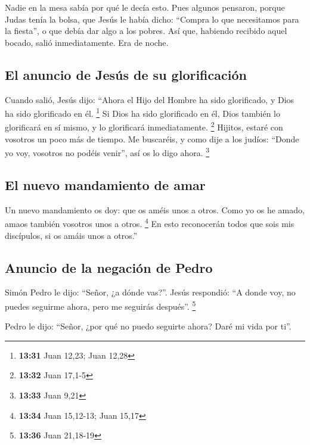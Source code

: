 \begin{paracol}{2}
 Nadie en la mesa sabía por qué le decía esto.
 Pues algunos pensaron, porque Judas tenía la bolsa, que
Jesús le había dicho: ``Compra lo que necesitamos para la fiesta'', o
que debía dar algo a los pobres.  Así que, habiendo
recibido aquel bocado, salió inmediatamente. Era de noche.

\hypertarget{el-anuncio-de-jesuxfas-de-su-glorificaciuxf3n}{%
\subsection{El anuncio de Jesús de su
glorificación}\label{el-anuncio-de-jesuxfas-de-su-glorificaciuxf3n}}

 Cuando salió, Jesús dijo: ``Ahora el Hijo del Hombre ha
sido glorificado, y Dios ha sido glorificado en él. \footnote{\textbf{13:31}
  Juan 12,23; Juan 12,28}  Si Dios ha sido glorificado en
él, Dios también lo glorificará en sí mismo, y lo glorificará
inmediatamente. \footnote{\textbf{13:32} Juan 17,1-5} 
Hijitos, estaré con vosotros un poco más de tiempo. Me buscaréis, y como
dije a los judíos: ``Donde yo voy, vosotros no podéis venir'', así os lo
digo ahora. \footnote{\textbf{13:33} Juan 9,21}

\hypertarget{el-nuevo-mandamiento-de-amar}{%
\subsection{El nuevo mandamiento de
amar}\label{el-nuevo-mandamiento-de-amar}}

 Un nuevo mandamiento os doy: que os améis unos a otros.
Como yo os he amado, amaos también vosotros unos a otros. \footnote{\textbf{13:34}
  Juan 15,12-13; Juan 15,17}  En esto reconocerán todos
que sois mis discípulos, si os amáis unos a otros.''

\hypertarget{anuncio-de-la-negaciuxf3n-de-pedro}{%
\subsection{Anuncio de la negación de
Pedro}\label{anuncio-de-la-negaciuxf3n-de-pedro}}

 Simón Pedro le dijo: ``Señor, ¿a dónde vas?''. Jesús
respondió: ``A donde voy, no puedes seguirme ahora, pero me seguirás
después''. \footnote{\textbf{13:36} Juan 21,18-19}

 Pedro le dijo: ``Señor, ¿por qué no puedo seguirte
ahora? Daré mi vida por ti''.


\end{paracol}
